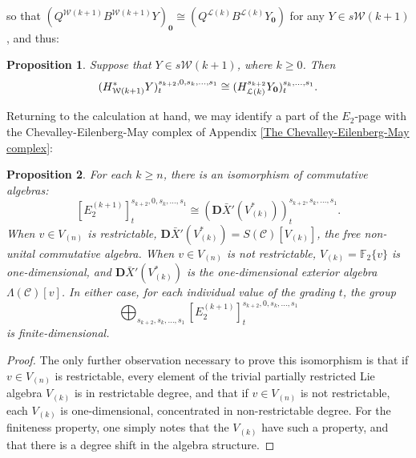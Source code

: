 \documentclass[11pt]{amsart} \renewcommand{\baselinestretch}{1.2}
\theoremstyle{plain}
\newtheorem{thm}{Theorem}[section]
\newtheorem{prop}[thm]{Proposition}
\theoremstyle{definition}
\renewcommand{\to}{\longrightarrow}
\newcommand{\scrC}{\mathscr{C}}
\newcommand{\calL}{\mathcal{L}}
\newcommand{\calw}{\mathcal{W}}
\newcommand{\calMv}{\mathcal{M}\dver}
\newcommand{\calMh}{\mathcal{M}\dhor}
\newcommand{\CommOperad}{{\scrC}}
\newcommand{\UEAX}{\bar{X}'}%
\newcommand{\F}{\mathbb{F}}
\newcommand{\Ftwo}{\F_2}
\newcommand{\E}[5]{[E^{#1}_{#2}#3]^{#4}_{#5}}
\newcommand{\dver}{_\mathrm{v}}
\newcommand{\dhor}{_\mathrm{h}}
\newcommand{\dual}{\mathbf{D}}
\begin{document}
\begin{Calculations of HWn}
so that $(Q^{\calw(k+1)}B^{\calw(k+1)}Y)_{\textbf{0}} \cong(Q^{\calL(k)}B^{\calL(k)}Y_{\textbf{0}})$ for any $Y\in s\calw(k+1)$, and thus:
\begin{prop}
Suppose that $Y\in s\calw(k+1)$, where $k\geq0$. Then
\[(H^*_{\calw(k+1)}Y)^{s_{k+2},0,s_k,\ldots,s_1}_{t}\cong (H^{s_{k+2}}_{\calL(k)}Y_\textup{\textbf{0}})^{s_k,\ldots,s_1}_t.\]
\end{prop}
Returning to the calculation at hand, we may identify a part of the $E_2$-page with the Chevalley-Eilenberg-May complex of Appendix \ref{The Chevalley-Eilenberg-May complex}:
\begin{prop}
\label{calculation in internal dimension zero}
For each $k\geq n$, there is an isomorphism of commutative algebras:
\[\E{(k+1)}{2}{}{s_{k+2},0,s_k,\ldots,s_1}{t} \cong(\dual\UEAX(V^*_{(k)}))^{s_{k+2},s_k,\ldots,s_1}_t.\]
When $v\in V_{(n)}$ is restrictable,  $\dual\UEAX(V^*_{(k)})=S(\CommOperad)[V_{(k)}]$, the free non-unital commutative algebra. When $v\in V_{(n)}$ is not restrictable, $V_{(k)}=\Ftwo\{v\}$ is one-dimensional, and $\dual\UEAX(V^*_{(k)})$ is the one-dimensional exterior algebra $\Lambda(\CommOperad)[v]$. In either case, for each individual value of the grading $t$, the group \[\bigoplus_{s_{k+2},s_k,\ldots,s_1}\E{(k+1)}{2}{}{s_{k+2},0,s_k,\ldots,s_1}{t}\] is finite-dimensional.
\end{prop}
\begin{proof}
The only further observation necessary to prove this isomorphism is that if $v\in V_{(n)}$ is restrictable, every element of the trivial partially restricted Lie algebra $V_{(k)}$ is in restrictable degree, and that if $v\in V_{(n)}$ is not restrictable, each $V_{(k)}$ is one-dimensional, concentrated in non-restrictable degree. For the finiteness property, one simply notes that the $V_{(k)}$ have such a property, and that there is a degree shift in the algebra structure.
\end{proof}


\end{Calculations of HWn}
\end{document}
